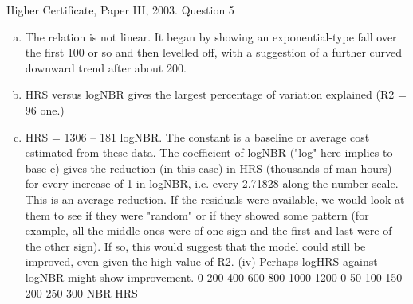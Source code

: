 \documentclass[a4paper,12pt]{article}
\begin{document}
Higher Certificate, Paper III, 2003. Question 5
\begin{enumerate}[(a)]
\item 
The relation is not linear. It began by showing an exponential-type fall over
the first 100 or so and then levelled off, with a suggestion of a further curved
downward trend after about 200.
\item HRS versus logNBR gives the largest percentage of variation explained
(R2 = 96%
one.)
\item HRS = 1306 – 181 logNBR. The constant is a baseline or average cost
estimated from these data. The coefficient of logNBR ("log" here implies to
base e) gives the reduction (in this case) in HRS (thousands of man-hours) for
every increase of 1 in logNBR, i.e. every 2.71828 along the number scale.
This is an average reduction.
If the residuals were available, we would look at them to see if they were
"random" or if they showed some pattern (for example, all the middle ones
were of one sign and the first and last were of the other sign). If so, this would
suggest that the model could still be improved, even given the high value of
R2.
(iv) Perhaps logHRS against logNBR might show improvement.
0
200
400
600
800
1000
1200
0 50 100 150 200 250 300
NBR
HRS
\end{enumerate}
\end{document}
